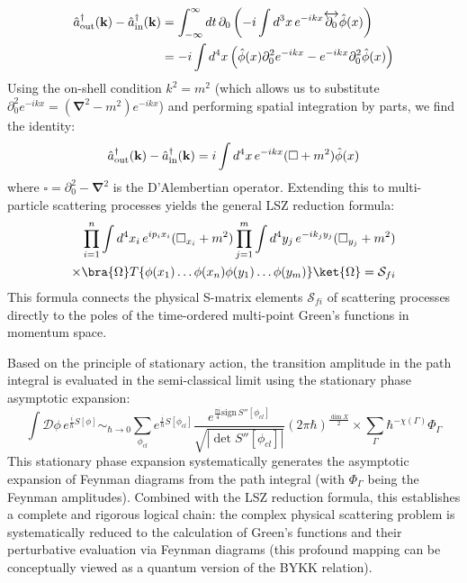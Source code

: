 \begin{equation}
\begin{aligned}
\hat{a}^\dagger_{\rm out}(\mathbf{k}) - \hat{a}^\dagger_{\rm in}(\mathbf{k}) &= \int_{-\infty}^{\infty} dt \, \partial_0 \left( -i \int d^3x \, e^{-ikx} \overleftrightarrow{\partial_0} \hat{\phi}(x) \right) \\
&= -i \int d^4x \left( \hat{\phi}(x) \partial_0^2 e^{-ikx} - e^{-ikx} \partial_0^2 \hat{\phi}(x) \right)
\end{aligned}
\end{equation}
Using the on-shell condition $k^2 = m^2$ (which allows us to substitute $\partial_0^2 e^{-ikx} = (\mathbf{\nabla}^2 - m^2) e^{-ikx}$) and performing spatial integration by parts, we find the identity:
\begin{equation}
\hat{a}^\dagger_{\rm out}(\mathbf{k}) - \hat{a}^\dagger_{\rm in}(\mathbf{k}) = i \int d^4x \, e^{-ikx} (\square + m^2) \hat{\phi}(x)
\end{equation}
where $\square = \partial_0^2 - \mathbf{\nabla}^2$ is the D'Alembertian operator. Extending this to multi-particle scattering processes yields the general LSZ reduction formula:
\begin{equation}
\begin{split}
\prod_{i=1}^n \int d^4x_i \, e^{ip_i x_i}(\square_{x_i} + m^2) \prod_{j=1}^m \int d^4y_j \, e^{-ik_j y_j}(\square_{y_j} + m^2) \\
\times \bra{\Omega} T\{\phi(x_1)\dots\phi(x_n)\phi(y_1)\dots\phi(y_m)\} \ket{\Omega} = \mathcal{S}_{fi}
\end{split}
\label{eq:lsz_reduction_scalar}
\end{equation}
This formula connects the physical S-matrix elements $\mathcal{S}_{fi}$ of scattering processes directly to the poles of the time-ordered multi-point Green's functions in momentum space.

Based on the principle of stationary action, the transition amplitude in the path integral is evaluated in the semi-classical limit using the stationary phase asymptotic expansion:
\begin{equation}
\int \mathcal{D}\phi \, e^{\frac{i}{\hbar}S[\phi]} \sim_{\hbar\to 0} \sum_{\phi_{cl}} e^{\frac{i}{\hbar}S[\phi_{cl}]} \frac{e^{\frac{\pi i}{4}\mathrm{sign}\, S''[\phi_{cl}]}}{\sqrt{|\det S''[\phi_{cl}]|}} (2\pi\hbar)^{\frac{\dim X}{2}} \times \sum_{\Gamma} \hbar^{-\chi(\Gamma)} \Phi_\Gamma
\end{equation}
This stationary phase expansion systematically generates the asymptotic expansion of Feynman diagrams from the path integral (with $\Phi_\Gamma$ being the Feynman amplitudes). Combined with the LSZ reduction formula, this establishes a complete and rigorous logical chain: the complex physical scattering problem is systematically reduced to the calculation of Green's functions and their perturbative evaluation via Feynman diagrams (this profound mapping can be conceptually viewed as a quantum version of the BYKK relation).

